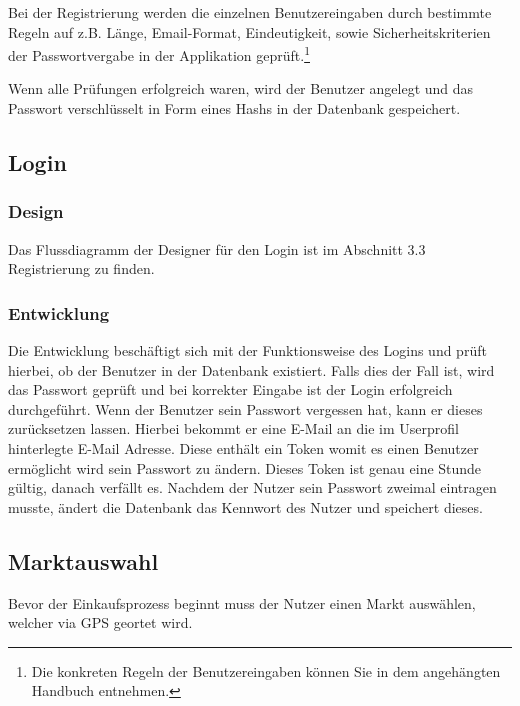 \documentclass[12pt,a4paper]{article}
\begin{document}
Bei der Registrierung werden die einzelnen Benutzereingaben durch bestimmte Regeln auf z.B. Länge, Email-Format, Eindeutigkeit, sowie Sicherheitskriterien der Passwortvergabe in der Applikation geprüft.\footnote{Die konkreten Regeln der Benutzereingaben können Sie in dem angehängten Handbuch entnehmen.}

Wenn alle Prüfungen erfolgreich waren, wird der Benutzer angelegt und das Passwort verschlüsselt in Form eines Hashs in der Datenbank gespeichert.
\newpage
\subsection{Login}
\subsubsection*{Design}
Das Flussdiagramm der Designer für den Login ist im Abschnitt 3.3 Registrierung zu finden. 
\subsubsection*{Entwicklung}
Die Entwicklung beschäftigt sich mit der Funktionsweise des Logins und prüft hierbei, ob der Benutzer in der Datenbank existiert. Falls dies der Fall ist, wird das Passwort geprüft und bei korrekter Eingabe ist der Login erfolgreich durchgeführt.
Wenn der Benutzer sein Passwort vergessen hat, kann er dieses zurücksetzen lassen. Hierbei bekommt er eine E-Mail an die im Userprofil hinterlegte E-Mail Adresse. Diese enthält ein Token womit es einen Benutzer ermöglicht wird sein Passwort zu ändern. Dieses Token ist genau eine Stunde gültig, danach verfällt es. 
Nachdem der Nutzer sein Passwort zweimal eintragen musste, ändert die Datenbank das Kennwort des Nutzer und speichert dieses.
\newpage
\subsection{Marktauswahl}
Bevor der Einkaufsprozess beginnt muss der Nutzer einen Markt auswählen, welcher via GPS geortet wird. 
\end{document}
